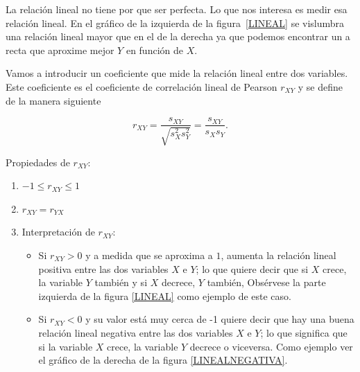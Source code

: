\documentclass[12pt]{report}
\begin{document}
La relación lineal no tiene por que ser perfecta. Lo que nos interesa es medir esa
relación lineal. En el gráfico de la izquierda de la figura~\ref{LINEAL} se vislumbra una
relación lineal mayor que en el de la derecha ya que podemos encontrar un a recta que
aproxime mejor  $Y$ en función de $X$.

Vamos  a introducir un coeficiente que mide la relación lineal   entre
 dos variables. Este coeficiente es el coeficiente de correlación lineal de Pearson
 $r_{XY}$  y se define de la manera siguiente

$$
r_{XY}=\frac{s_{XY}}{\sqrt{s^2_{X}s^2_{Y}}}=\frac{s_{XY}}{s_{X}s_{Y}}.
$$



Propiedades de $r_{XY}$:
\begin{enumerate}[1)]
\item $-1\leq r_{XY}\leq 1$
\item $r_{XY}=r_{YX}$
\item Interpretación de $r_{XY}$:
\begin{itemize}
\item Si $r_{XY}>0$ y a medida que  se aproxima a  $1$,
aumenta la relación lineal positiva entre las dos variables $X$ e $Y$; lo que quiere
decir que si $X$  crece, la variable $Y$ también y si   $X$ decrece,  $Y$  también,
Obsérvese la parte  izquierda de la figura \ref{LINEAL} como ejemplo de este caso.
 \item Si $r_{XY}<0$  y su valor está muy cerca de -1 quiere
 decir  que hay una buena relación lineal negativa entre las dos variables $X$
 e $Y$; lo
  que significa que si la variable
  $X$    crece, la variable $Y$ decrece o viceversa. Como ejemplo ver
  el gráfico de la derecha de la figura \ref{LINEALNEGATIVA}.


\end{itemize}
\end{enumerate}
\end{document}

